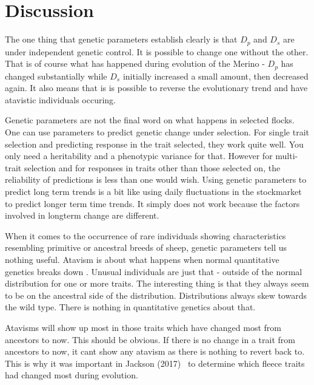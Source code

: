 \documentclass[titlepage]{article}  %
\begin{document}
\section{Discussion}
The one thing that genetic parameters establish clearly is that $D_{p}$ and $D_{s}$ are under independent genetic control. It is possible to change one without the other. That is of course what has happened during evolution of the Merino - $D_{p}$ has changed substantially while $D_{s}$ initially increased a small amount, then decreased again. It also means that is is possible to reverse the evolutionary trend and have atavistic individuals occuring.

Genetic parameters are not the final word on what happens in selected flocks. One can use parameters to predict genetic change under selection. For single trait selection and predicting response in the trait selected, they work quite well. You only need a heritability and a phenotypic variance for that. 
However for multi-trait selection and for responses in traits other than those selected on, the reliability of predictions is less than one would wish. 
Using genetic parameters to predict long term trends is a bit like using daily fluctuations in the stockmarket to predict longer term time trends. It simply does not work because the factors involved in longterm change are different. 

When it comes to the occurrence of rare individuals showing  characteristics resembling primitive or ancestral breeds of sheep, genetic parameters tell us nothing useful. Atavism is about what happens when normal quantitative genetics breaks down . Unusual individuals are just that - outside of the normal distribution for one or more traits. The interesting thing is that they always seem to be on the ancestral side of the distribution. Distributions always skew towards the wild type. There is nothing in quantitative genetics about that. 

Atavisms will show up most in those traits which have changed most from ancestors to now. This should be obvious. If there is no change in a trait from ancestors to now, it cant show any atavism as there is nothing to revert back to. This is why it was important in Jackson (2017)~\cite{jack:17} to determine which fleece traits had changed most during evolution. 
\end{document}
